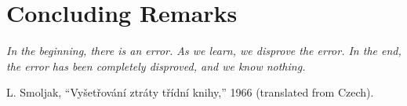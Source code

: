 \chapter{Concluding Remarks}
\label{part:conclusions}

\epigraph{ \it
    In the beginning, there is an error.
    As we learn, we disprove the error.
    In the end, the error has been completely disproved, and we know nothing.
}{
    L. Smoljak, ``Vyšetřování ztráty třídní knihy,'' 1966 (translated from Czech).
}